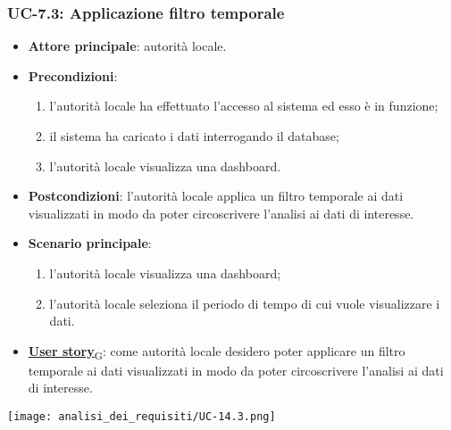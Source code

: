 \subsubsection{UC-7.3: Applicazione filtro temporale}
\begin{itemize}
	\item \textbf{Attore principale}: autorità locale.
	\item \textbf{Precondizioni}:
	      \begin{enumerate}
		      \item l'autorità locale ha effettuato l'accesso al sistema ed esso è in funzione;
		      \item il sistema ha caricato i dati interrogando il database;
		      \item l'autorità locale visualizza una dashboard.
	      \end{enumerate}
	\item \textbf{Postcondizioni}: l'autorità locale applica un filtro temporale ai dati visualizzati in modo da poter circoscrivere l'analisi ai dati di interesse.
	\item \textbf{Scenario principale}:
	      \begin{enumerate}
		      \item l'autorità locale visualizza una dashboard;
		      \item l'autorità locale seleziona il periodo di tempo di cui vuole visualizzare i dati.
	      \end{enumerate}
	\item \href{https://7last.github.io/docs/rtb/documentazione-interna/glossario\#user-story}{\textbf{User story}\textsubscript{G}}:
	      come autorità locale desidero poter applicare un filtro temporale ai dati visualizzati in modo da poter circoscrivere l'analisi ai dati di interesse.
\end{itemize}
\begin{center}
	\texttt{[image: analisi\_dei\_requisiti/UC-14.3.png]}
\end{center}

